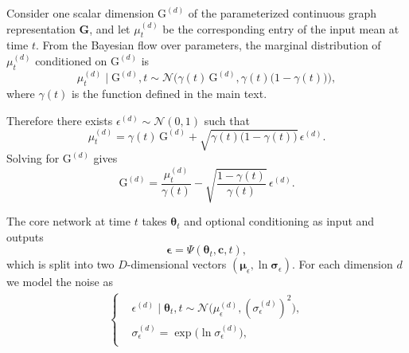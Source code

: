 \documentclass[numsec,webpdf,contemporary,large]{oup-authoring-template}%
\theoremstyle{thmstyleone}%
\theoremstyle{thmstyletwo}%
\theoremstyle{thmstylethree}%
\begin{document}
Consider one scalar dimension $\mathrm{G}^{(d)}$ of the parameterized continuous graph representation $\mathbf{G}$, and let $\mu_t^{(d)}$ be the corresponding entry of the input mean at time $t$.
From the Bayesian flow over parameters, the marginal distribution of $\mu_t^{(d)}$ conditioned on $\mathrm{G}^{(d)}$ is
\begin{equation}
    \mu_t^{(d)} \mid \mathrm{G}^{(d)}, t
    \sim
    \mathcal{N}\!\big(
        \gamma(t)\,\mathrm{G}^{(d)},
        \gamma(t)\bigl(1-\gamma(t)\bigr)
    \big),
\end{equation}
where $\gamma(t)$ is the function defined in the main text.

Therefore there exists $\epsilon^{(d)} \sim \mathcal{N}(0,1)$ such that
\begin{equation}
    \mu_t^{(d)}
    =
    \gamma(t)\,\mathrm{G}^{(d)}
    +
    \sqrt{\gamma(t)\bigl(1-\gamma(t)\bigr)}\,
    \epsilon^{(d)}.
\end{equation}
Solving for $\mathrm{G}^{(d)}$ gives
\begin{equation}
    \mathrm{G}^{(d)}
    =
    \frac{\mu_t^{(d)}}{\gamma(t)}
    -
    \sqrt{\frac{1-\gamma(t)}{\gamma(t)}}\,
    \epsilon^{(d)}.
    \label{eq:app-G-from-eps}
\end{equation}

The core network at time $t$ takes $\boldsymbol{\theta}_t$ and optional conditioning as input and outputs
\begin{equation}
    \boldsymbol{\epsilon}
    =
    \Psi(\boldsymbol{\theta}_t, \mathbf{c}, t),
\end{equation}
which is split into two $D$-dimensional vectors $(\boldsymbol{\mu}_\epsilon, \ln\boldsymbol{\sigma}_\epsilon)$.
For each dimension $d$ we model the noise as
\begin{equation}
    \begin{aligned}
        \left\{
    \begin{aligned}
        & \epsilon^{(d)} \mid \boldsymbol{\theta}_t, t \sim \mathcal{N}\!\big( \mu_\epsilon^{(d)}, (\sigma_\epsilon^{(d)})^2 \big), \\
        & \sigma_\epsilon^{(d)} = \exp\bigl(\ln\sigma_\epsilon^{(d)}\bigr), \\
    \end{aligned}
    \right.
    \end{aligned}
\end{equation}
\end{document}
